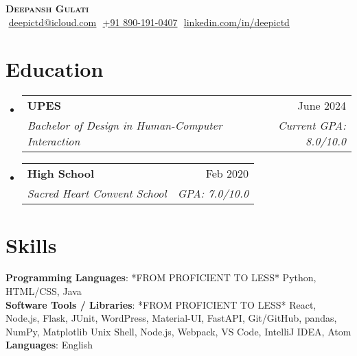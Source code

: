 \documentclass[letterpaper,11pt]{article}
\makeatletter
\newcommand{\resumeSubheading}[4]{
  \vspace{-2pt}\item
    \begin{tabular*}{0.97\textwidth}[t]{l@{\extracolsep{\fill}}r}
      \textbf{#1} & #2 \\
      \textit{\small#3} & \textit{\small #4} \\
    \end{tabular*}\vspace{-7pt}
}
\newcommand{\resumeSubHeadingListStart}{\begin{itemize}[leftmargin=0.15in, label={}]}
\newcommand{\resumeSubHeadingListEnd}{\end{itemize}}
\makeatother
\begin{document}
\begin{flushright}
  \vspace{-4pt}
\end{flushright}

\vspace{-7pt}

\begin{center}
    \textbf{\Huge \scshape Deepansh Gulati} \\ \vspace{8pt}
    \small 
    \faEnvelope$  $
    \href{mailto:deepictd@icloud.com}
    {\underline{deepictd@icloud.com}}
    \faPhone$  $
    \underline{+91 890-191-0407}
    \faLinkedin$  $
    \href{https://linkedin.com/in/deepictd}{\underline{linkedin.com/in/deepictd}} $  $
\end{center}

\section{Education}
  \resumeSubHeadingListStart
  
    \resumeSubheading
      {UPES}{June 2024}
      {Bachelor of Design in Human-Computer Interaction}{Current GPA: 8.0/10.0}
      
    \resumeSubheading
      {High School \footnotesize}{Feb 2020}
      {Sacred Heart Convent School}{GPA: 7.0/10.0}

  \resumeSubHeadingListEnd

\section{Skills}
 \begin{itemize}[leftmargin=0.15in, label={}]
    \small{\item{
    
     \textbf{Programming Languages}{: *FROM PROFICIENT TO LESS* Python, HTML/CSS, Java} \\
     
     \textbf{Software Tools / Libraries}{: *FROM PROFICIENT TO LESS* React, Node.js, Flask, JUnit, WordPress, Material-UI, FastAPI, Git/GitHub, pandas, NumPy, Matplotlib Unix Shell, Node.js, Webpack, VS Code, IntelliJ IDEA, Atom} \\

     \textbf{Languages}{: English} \\
     
    }}
 \end{itemize}
\end{document}

